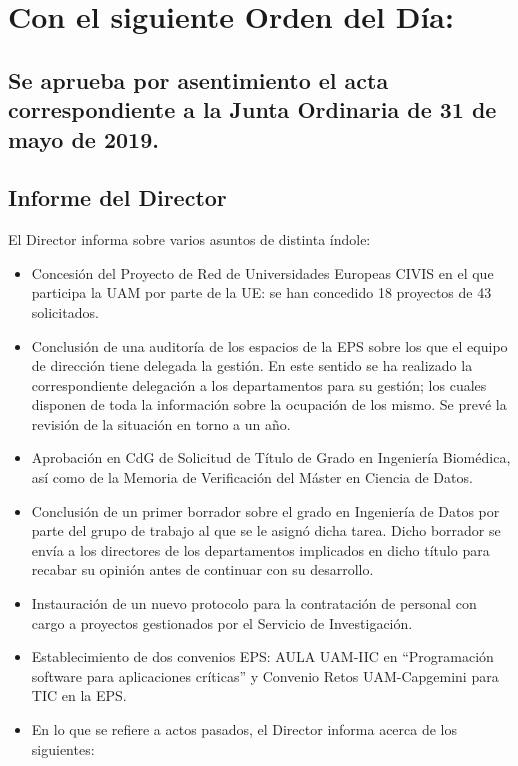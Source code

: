 \documentclass[numerado]{plantillasEPS} %
\begin{document}
\newpage

\chapter{Con el siguiente Orden del Día:}

\section{Se aprueba por asentimiento el acta correspondiente a la Junta Ordinaria de 31 de mayo de 2019.} 
\section{Informe del Director}
El Director informa sobre varios asuntos de distinta índole:

\begin{itemize}
    \item Concesión del Proyecto de Red de Universidades Europeas CIVIS en el que participa la UAM por parte de la UE: se han concedido 18 proyectos de 43 solicitados. 
    \item Conclusión  de una  auditoría  de  los espacios  de  la  EPS  sobre  los  que  el  equipo  de dirección    tiene    delegada    la    gestión.    En    este    sentido    se    ha    realizado la correspondiente   delegación   a   los departamentos   para su   gestión;   los   cuales disponen  de  toda la  información  sobre  la  ocupación de  los  mismo.  Se  prevé  la revisión de la situación en torno a un año. 
    \item Aprobación  en  CdG de  Solicitud  de  Título  de  Grado  en  Ingeniería  Biomédica,  así como de la Memoria de Verificación del Máster en Ciencia de Datos. 
    \item Conclusión  de  un  primer  borrador  sobre  el  grado  en Ingeniería  de  Datos  por  parte del  grupo  de  trabajo  al  que  se  le  asignó  dicha  tarea.  Dicho  borrador se  envía  a  los directores de los departamentos implicados en dicho título para recabar su opinión antes de continuar con su desarrollo.
    \item Instauración  de  un  nuevo  protocolo  para la contratación de  personal con  cargo  a proyectos gestionados por el Servicio de Investigación.
    \item Establecimiento  de  dos convenios  EPS:  AULA  UAM-IIC en “Programación software para aplicaciones críticas” y Convenio Retos UAM-Capgemini para TIC en la EPS.
    \item En lo que se refiere a actos pasados, el Director informa acerca de los siguientes:
    

\end{itemize}
\end{document}
